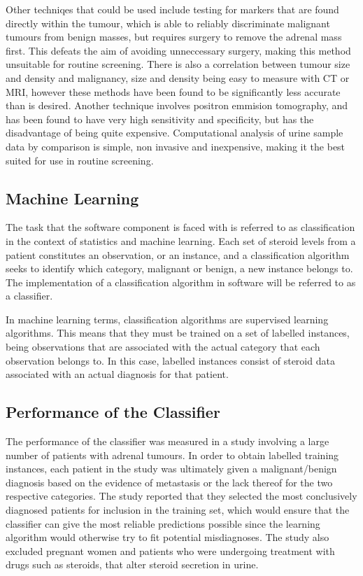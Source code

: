 \documentclass[a4paper]{article}
\begin{document}
Other techniqes that could be used include testing for markers that are 
found directly within
the tumour, which is able to reliably discriminate malignant tumours from
benign masses, but requires surgery to remove the adrenal mass
first. This defeats the aim of avoiding unneccessary surgery, making this
method unsuitable for routine screening. There is also a correlation between
tumour size and density and malignancy, size and density being easy to
measure with CT or
MRI, however these methods have been found to be significantly less
accurate than is desired. Another technique involves positron emmision
tomography, and has been found to have very high sensitivity and 
specificity, but has the disadvantage of being quite expensive.
Computational analysis of urine sample data by comparison is simple, non
invasive and inexpensive, making it the best suited for use in routine
screening.


\subsection{Machine Learning}
The task that the software component is faced with is referred to as
classification in the context of statistics and machine learning. Each
set of steroid levels from a patient constitutes an observation, or an
instance, and a classification algorithm seeks to identify which category,
malignant or benign, a new instance belongs to. The implementation of a
classification algorithm in software will be referred to as a classifier.

In machine learning terms, classification algorithms are supervised
learning algorithms. This means that they must be trained on a set of
labelled instances, being observations that are associated with the 
actual category that each observation belongs to. In this case, labelled
instances consist of steroid data associated with an actual diagnosis for
that patient.


\subsection{Performance of the Classifier}
The performance of the classifier was measured in a study involving a large
number of patients with adrenal tumours. In order to obtain labelled
training instances, each patient in the study was ultimately given a
malignant/benign diagnosis based on the evidence of metastasis or the
lack thereof for the two respective categories. The study reported that
they selected the most conclusively diagnosed patients for inclusion in
the training set, which would ensure that the classifier can give the
most reliable predictions possible since the learning algorithm would
otherwise try to fit potential misdiagnoses. The study also excluded
pregnant women and patients who were undergoing treatment with drugs such
as steroids, that alter steroid secretion in urine.
\end{document}
